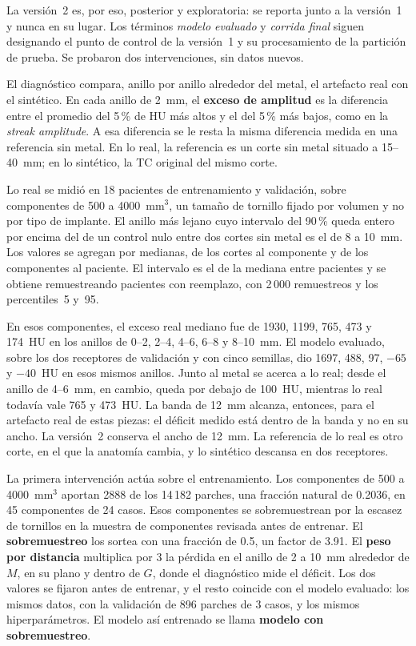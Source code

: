 La versión~2 es, por eso, posterior y exploratoria: se reporta junto a la versión~1 y nunca en su lugar. Los términos \emph{modelo evaluado} y \emph{corrida final} siguen designando el punto de control de la versión~1 y su procesamiento de la partición de prueba. Se probaron dos intervenciones, sin datos nuevos.

El diagnóstico compara, anillo por anillo alrededor del metal, el artefacto real con el sintético. En cada anillo de 2~mm, el \textbf{exceso de amplitud} es la diferencia entre el promedio del 5\,\% de HU más altos y el del 5\,\% más bajos, como en la \emph{streak amplitude}. A esa diferencia se le resta la misma diferencia medida en una referencia sin metal. En lo real, la referencia es un corte sin metal situado a 15--40~mm; en lo sintético, la TC original del mismo corte.

Lo real se midió en 18 pacientes de entrenamiento y validación, sobre componentes de 500 a 4000~mm$^3$, un tamaño de tornillo fijado por volumen y no por tipo de implante. El anillo más lejano cuyo intervalo del 90\,\% queda entero por encima del de un control nulo entre dos cortes sin metal es el de 8 a 10~mm. Los valores se agregan por medianas, de los cortes al componente y de los componentes al paciente. El intervalo es el de la mediana entre pacientes y se obtiene remuestreando pacientes con reemplazo, con 2\,000 remuestreos y los percentiles~5 y~95.

En esos componentes, el exceso real mediano fue de 1930, 1199, 765, 473 y 174~HU en los anillos de 0--2, 2--4, 4--6, 6--8 y 8--10~mm. El modelo evaluado, sobre los dos receptores de validación y con cinco semillas, dio 1697, 488, 97, $-65$ y $-40$~HU en esos mismos anillos. Junto al metal se acerca a lo real; desde el anillo de 4--6~mm, en cambio, queda por debajo de 100~HU, mientras lo real todavía vale 765 y 473~HU. La banda de 12~mm alcanza, entonces, para el artefacto real de estas piezas: el déficit medido está dentro de la banda y no en su ancho. La versión~2 conserva el ancho de 12~mm. La referencia de lo real es otro corte, en el que la anatomía cambia, y lo sintético descansa en dos receptores.

La primera intervención actúa sobre el entrenamiento. Los componentes de 500 a 4000~mm$^3$ aportan 2888 de los 14\,182 parches, una fracción natural de 0.2036, en 45 componentes de 24 casos. Esos componentes se sobremuestrean por la escasez de tornillos en la muestra de componentes revisada antes de entrenar. El \textbf{sobremuestreo} los sortea con una fracción de 0.5, un factor de 3.91. El \textbf{peso por distancia} multiplica por 3 la pérdida en el anillo de 2 a 10~mm alrededor de $M$, en su plano y dentro de $G$, donde el diagnóstico mide el déficit. Los dos valores se fijaron antes de entrenar, y el resto coincide con el modelo evaluado: los mismos datos, con la validación de 896 parches de 3 casos, y los mismos hiperparámetros. El modelo así entrenado se llama \textbf{modelo con sobremuestreo}.

